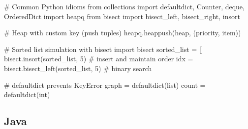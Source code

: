 \documentclass[11pt]{article}
\newenvironment{Shaded}{\begin{snugshade}}{\end{snugshade}}
\newcommand{\BuiltInTok}[1]{\textcolor[rgb]{0.50,0.55,0.55}{#1}}
\newcommand{\CommentTok}[1]{\textcolor[rgb]{0.48,0.49,0.49}{#1}}
\newcommand{\DecValTok}[1]{\textcolor[rgb]{0.96,0.45,0.00}{#1}}
\newcommand{\ImportTok}[1]{\textcolor[rgb]{0.15,0.68,0.38}{#1}}
\newcommand{\NormalTok}[1]{\textcolor[rgb]{0.81,0.81,0.76}{#1}}
\newcommand{\OperatorTok}[1]{\textcolor[rgb]{0.81,0.81,0.76}{#1}}
\begin{document}
\begin{Shaded}
\begin{Highlighting}[]
\CommentTok{\# Common Python idioms}
\ImportTok{from}\NormalTok{ collections }\ImportTok{import}\NormalTok{ defaultdict, Counter, deque, OrderedDict}
\ImportTok{import}\NormalTok{ heapq}
\ImportTok{from}\NormalTok{ bisect }\ImportTok{import}\NormalTok{ bisect\_left, bisect\_right, insort}

\CommentTok{\# Heap with custom key (push tuples)}
\NormalTok{heapq.heappush(heap, (priority, item))}

\CommentTok{\# Sorted list simulation with bisect}
\ImportTok{import}\NormalTok{ bisect}
\NormalTok{sorted\_list }\OperatorTok{=}\NormalTok{ []}
\NormalTok{bisect.insort(sorted\_list, }\DecValTok{5}\NormalTok{)         }\CommentTok{\# insert and maintain order}
\NormalTok{idx }\OperatorTok{=}\NormalTok{ bisect.bisect\_left(sorted\_list, }\DecValTok{5}\NormalTok{)  }\CommentTok{\# binary search}

\CommentTok{\# defaultdict prevents KeyError}
\NormalTok{graph }\OperatorTok{=}\NormalTok{ defaultdict(}\BuiltInTok{list}\NormalTok{)}
\NormalTok{count }\OperatorTok{=}\NormalTok{ defaultdict(}\BuiltInTok{int}\NormalTok{)}
\end{Highlighting}
\end{Shaded}

\subsection{Java}\label{java}
\end{document}
